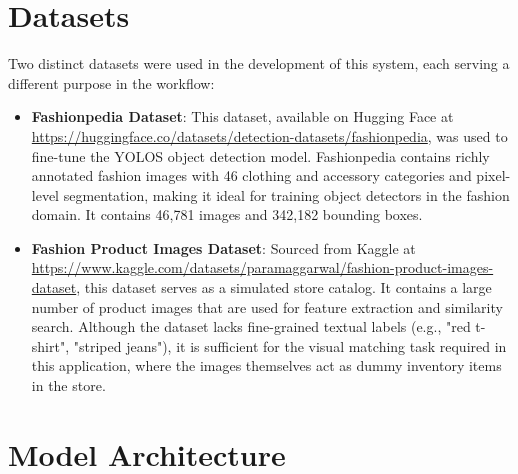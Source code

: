 \section*{Datasets}

Two distinct datasets were used in the development of this system, each serving a different purpose in the workflow:

\begin{itemize}
    \item \textbf{Fashionpedia Dataset}:     This dataset, available on Hugging Face at \url{https://huggingface.co/datasets/detection-datasets/fashionpedia}, was used to fine-tune the YOLOS object detection model. Fashionpedia contains richly annotated fashion images with 46 clothing and accessory categories and pixel-level segmentation, making it ideal for training object detectors in the fashion domain. It contains 46,781 images and 342,182 bounding boxes.

    \item \textbf{Fashion Product Images Dataset}: Sourced from Kaggle at \url{https://www.kaggle.com/datasets/paramaggarwal/fashion-product-images-dataset}, this dataset serves as a simulated store catalog. It contains a large number of product images that are used for feature extraction and similarity search. Although the dataset lacks fine-grained textual labels (e.g., "red t-shirt", "striped jeans"), it is sufficient for the visual matching task required in this application, where the images themselves act as dummy inventory items in the store.
\end{itemize}



\section*{Model Architecture}

